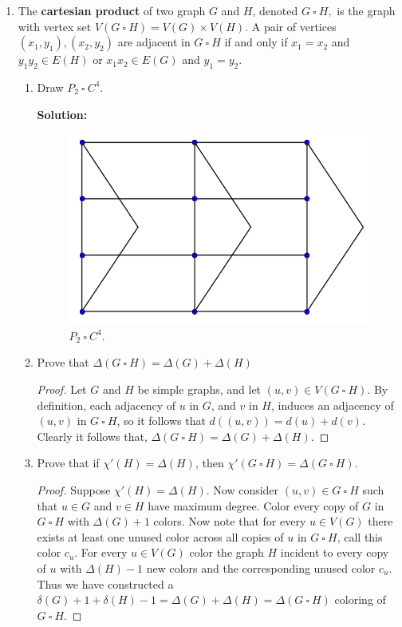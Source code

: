 \documentclass[12pt]{article}
\renewcommand{\emph}[1]{\textsf{\textbf{#1}}}
\newcommand{\localhead}[1]{\par\smallskip\textbf{#1}\nobreak\\}%
\newcommand\solution{\localhead{Solution:}}
\begin{document}
\begin{enumerate}
	\newpage



	\item The \emph{cartesian product} of two graph $G$ and $H$, denoted $G \: \square \: H,$
	is the graph with vertex set $V(G \: \square \: H)=V(G) \times V(H).$ A pair of vertices $(x_1,y_1), (x_2,y_2)$ are adjacent in  $G \: \square \: H$ if and only if $x_1=x_2$ and $y_1y_2 \in E(H)$ or $x_1x_2 \in E(G)$ and $y_1=y_2.$
	\begin{enumerate}
	\item Draw $P_2 \: \square \: C^4.$
	\solution 
	\begin{figure}[H]
		\begin{center}
			\caption{$P_2 \: \square \: C^4.$}
			\includegraphics[width=.45\textwidth]{CartProd.png}
		\end{center}
	\end{figure}



	\item Prove that $\Delta(G \: \square \: H)= \Delta(G) + \Delta(H)$
	\begin{proof}
		
		Let $G$ and $H$ be simple graphs, and let $(u,v) \in V(G \: \square \: H)$. By definition, each adjacency of $u$ in $G$, and $v$ in $H$, induces an adjacency of $(u, v)$ in $G \: \square \: H$, so it follows that $d((u, v)) = d(u) + d(v)$. Clearly it follows that, $\Delta(G \: \square \: H)= \Delta(G) + \Delta(H)$. 
	\end{proof}
		





	\item Prove that if $\chi'(H)=\Delta(H)$, then $\chi'(G \: \square \: H)=\Delta(G \: \square \: H).$
	\begin{proof} Suppose $\chi'(H)=\Delta(H)$. Now consider $(u, v) \in G \: \square \: H$ such that $u \in G$ and $v \in H$ have maximum degree. Color every copy of $G$ in $G \: \square \: H$ with $\Delta(G) + 1$ colors. Now note that for every $u \in V(G)$ there exists at least one unused color across all copies of $u$ in  $G \: \square \: H$, call this color $c_u$. For every $u \in V(G)$ color the graph $H$ incident to every copy of $u$ with $\Delta(H)-1$ new colors and the corresponding unused color $c_u$. Thus we have constructed a $\delta(G) + 1 + \delta(H) - 1 = \Delta(G) + \Delta(H) =\Delta(G \: \square \: H)$ coloring of $G \: \square \: H$.
		

\end{proof}
\end{enumerate}
\end{enumerate}
\end{document}
